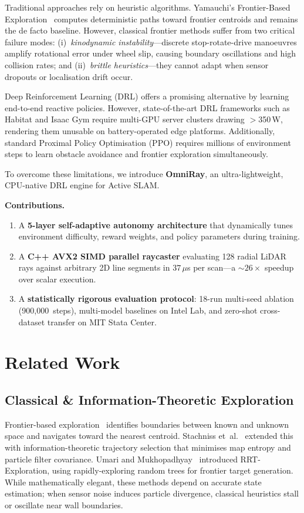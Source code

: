 \documentclass[conference]{IEEEtran}
\begin{document}
Traditional approaches rely on heuristic algorithms.
Yamauchi's Frontier-Based Exploration~\cite{yamauchi1997} computes deterministic paths toward frontier centroids and remains the de facto baseline.
However, classical frontier methods suffer from two critical failure modes: (i)~\textit{kinodynamic instability}---discrete stop-rotate-drive manoeuvres amplify rotational error under wheel slip, causing boundary oscillations and high collision rates; and (ii)~\textit{brittle heuristics}---they cannot adapt when sensor dropouts or localisation drift occur.

Deep Reinforcement Learning (DRL) offers a promising alternative by learning end-to-end reactive policies.
However, state-of-the-art DRL frameworks such as Habitat and Isaac Gym require multi-GPU server clusters drawing $>$350\,W, rendering them unusable on battery-operated edge platforms.
Additionally, standard Proximal Policy Optimisation (PPO) requires millions of environment steps to learn obstacle avoidance and frontier exploration simultaneously.

To overcome these limitations, we introduce \textbf{OmniRay}, an ultra-lightweight, CPU-native DRL engine for Active SLAM.

\noindent\textbf{Contributions.}
\begin{enumerate}
    \item A \textbf{5-layer self-adaptive autonomy architecture} that dynamically tunes environment difficulty, reward weights, and policy parameters during training.
    \item A \textbf{C++ AVX2 SIMD parallel raycaster} evaluating 128 radial LiDAR rays against arbitrary 2D line segments in $37\,\mu$s per scan---a ${\sim}26\times$ speedup over scalar execution.
    \item A \textbf{statistically rigorous evaluation protocol}: 18-run multi-seed ablation (900{,}000~steps), multi-model baselines on Intel Lab, and zero-shot cross-dataset transfer on MIT Stata Center.
\end{enumerate}

\section{Related Work}

\subsection{Classical \& Information-Theoretic Exploration}
Frontier-based exploration~\cite{yamauchi1997} identifies boundaries between known and unknown space and navigates toward the nearest centroid.
Stachniss et~al.~\cite{stachniss2005} extended this with information-theoretic trajectory selection that minimises map entropy and particle filter covariance.
Umari and Mukhopadhyay~\cite{umari2017} introduced RRT-Exploration, using rapidly-exploring random trees for frontier target generation.
While mathematically elegant, these methods depend on accurate state estimation; when sensor noise induces particle divergence, classical heuristics stall or oscillate near wall boundaries.
\end{document}
